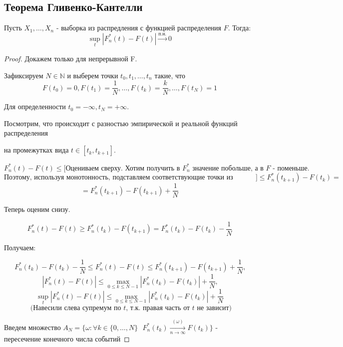 \subsection{Теорема Гливенко-Кантелли}

\begin{theorem*}
    Пусть $X_1, \ldots , X_n$ - выборка из распредления с функцией распределения $F$. Тогда: $$\sup_{t} |F_{n}^{*}(t) - F(t)| \xrightarrow{\textrm{п.н.}} 0$$
\end{theorem*}

\begin{proof}
    \text{}
    
    Докажем только для непрерывной F.
    
    Зафиксируем $N \in \mathbb{N}$ и выберем точки $t_0, t_1, \ldots , t_n$ такие, что
    $$F(t_0) = 0, F(t_1) = \frac{1}{N}, \ldots , F(t_k) = \frac{k}{N}, \ldots , F(t_N) = 1$$
    
    Для определенности $t_0 = -\infty, t_N = +\infty$.
    
    Посмотрим, что происходит с разностью эмпирической и реальной функций распределения
    
    на промежутках вида $t \in [t_k, t_{k+1}]$.
    
    $$F_{n}^{*}(t) - F(t) \leq \Big[ \textrm{Оцениваем сверху. Хотим получить в $F_{n}^{*}$ значение побольше, а в $F$ - поменьше.}$$
    $$\textrm{Поэтому, используя монотонность, подставляем соответствующие точки из промежутка} \Big] \leq F_{n}^{*}(t_{k + 1}) - F(t_{k}) =$$
    $$= F_{n}^{*}(t_{k + 1}) - F(t_{k + 1}) + \frac{1}{N}$$
    
    Теперь оценим снизу.
    
    $$F_{n}^{*}(t) - F(t) \geq F_{n}^{*}(t_{k}) - F(t_{k + 1}) = F_{n}^{*}(t_{k}) - F(t_{k}) - \frac{1}{N}$$
    
    Получаем:
    
    $$F_{n}^{*}(t_{k}) - F(t_{k}) - \frac{1}{N} \leq F_{n}^{*}(t) - F(t) \leq F_{n}^{*}(t_{k + 1}) - F(t_{k + 1}) + \frac{1}{N} \textrm{,}$$
    $$|F_{n}^{*}(t) - F(t)| \leq \max_{0 \leq k \leq N - 1} |F_{n}^{*}(t_k) - F(t_k)| + \frac{1}{N} \textrm{,}$$
    $$\sup_{t}|F_{n}^{*}(t) - F(t)| \leq \max_{0 \leq k \leq N - 1} |F_{n}^{*}(t_k) - F(t_k)| + \frac{1}{N}$$
    $$\textrm{ (Навесили слева супремум по $t$, т.к. правая часть от $t$ не зависит)}$$
    
    Введем множество $A_N = \Big\{ \omega: \forall k \in \{ 0, \ldots , N \} \textrm{ } F_{n}^{*}(t_k) \xrightarrow[n \rightarrow \infty]{(\omega)} F(t_k) \Big\}$ - пересечение конечного числа событий 
    

\end{proof}
